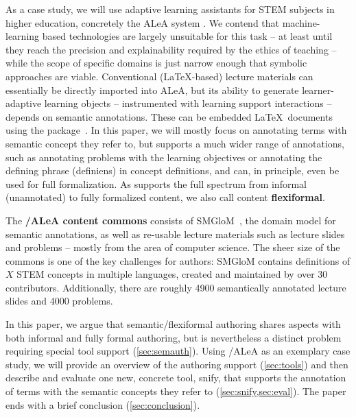 \documentclass{llncs}
\newcommand\ALeA{\textsf{ALeA}\xspace}
\newcommand\SMGloM{\textsf{SMGloM}\xspace}
\newcommand\snify{\textsf{snify}\xspace}
\begin{document}
As a case study, we will use adaptive learning assistants for STEM subjects in higher education, concretely the \ALeA system \cite{BerBetChu:lssmkm23}.
We contend that machine-learning based technologies are largely unsuitable for this task -- at least until they reach the
precision and explainability required by the ethics of teaching --
while the scope of specific domains is just narrow enough that symbolic approaches are viable.
Conventional (\LaTeX-based) lecture materials can essentially be directly imported into \ALeA,
but its ability to generate learner-adaptive learning objects -- instrumented with learning support interactions --
depends on semantic annotations.
These can be embedded \LaTeX\ documents using the \sTeX package~\cite{MueKo:sdstex22,sTeX:github:on}.
In this paper, we will mostly focus on annotating terms with semantic concept they refer to,
but \sTeX supports a much wider range of annotations, such as annotating problems with the learning objectives
or annotating the defining phrase (definiens) in concept definitions,
and can, in principle, even be used for full formalization.
As \sTeX supports the full spectrum from informal (unannotated) to fully formalized content,
we also call \sTeX content \textbf{flexiformal}.

The \textbf{\sTeX/\ALeA content commons} consists of \SMGloM~\cite{GinIanJuc:spsttom16},
the domain model for semantic annotations,
as well as re-usable lecture materials such as lecture slides and problems -- mostly from the area of computer science.
The sheer size of the commons is one of the key challenges for authors:
\SMGloM contains definitions of $X$ STEM concepts in multiple languages,
created and maintained by over 30 contributors.
Additionally, there are roughly 4900
semantically annotated lecture slides and 4000 problems.

In this paper, we argue that semantic/flexiformal authoring shares aspects with both informal and fully formal authoring,
but is nevertheless a distinct problem requiring special tool support (\cref{sec:semauth}).
Using \sTeX/\ALeA as an exemplary case study,
we will provide an overview of the authoring support (\cref{sec:tools})
and then describe and evaluate one new, concrete tool, \snify, that supports the annotation
of terms with the semantic concepts they refer to (\cref{sec:snify,sec:eval}).
The paper ends with a brief conclusion (\cref{sec:conclusion}).
\end{document}
